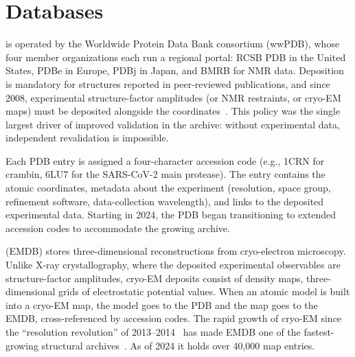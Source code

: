 \section{Databases}
\label{sec:databases}

 is operated by the Worldwide Protein
Data Bank consortium (wwPDB), whose four member organizations each run a
regional portal: RCSB PDB in the United States, PDBe in Europe, PDBj in
Japan, and BMRB for NMR data.
Deposition is mandatory for structures reported in peer-reviewed
publications, and since 2008, experimental structure-factor amplitudes
(or NMR restraints, or cryo-EM maps) must be deposited alongside the
coordinates~\cite{wlodawer2008}. This policy was the single largest driver of improved
validation in the archive: without experimental data, independent
revalidation is impossible.

Each PDB entry is assigned a four-character accession code (e.g., 1CRN
for crambin, 6LU7 for the SARS-CoV-2 main protease). The entry
contains the atomic coordinates, metadata about the experiment
(resolution, space group, refinement software, data-collection
wavelength), and links to the deposited experimental data. Starting
in 2024, the PDB began transitioning to extended accession codes
to accommodate the growing archive.

 (EMDB) stores
three-dimensional reconstructions from cryo-electron microscopy.
Unlike X-ray crystallography, where the deposited experimental
observables are structure-factor amplitudes, cryo-EM deposits
consist of density maps, three-dimensional grids of
electrostatic potential values. When an atomic model is built
into a cryo-EM map, the model goes to the PDB and the map goes
to the EMDB, cross-referenced by accession codes. The rapid
growth of cryo-EM since the ``resolution revolution'' of
2013--2014~\cite{kuhlbrandt2014}
has made EMDB one of the fastest-growing structural archives~\cite{lawson2011}.
As of 2024 it holds over 40{,}000 map entries.

